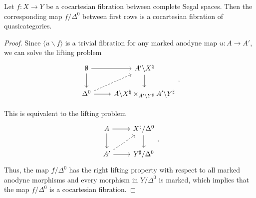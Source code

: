 \documentclass[main.tex]{subfiles}
\begin{document}
\begin{corollary}
  Let $f\colon X \to Y$ be a cocartesian fibration between complete Segal spaces. Then the corresponding map $f / \Delta^{0}$ between first rows is a cocartesian fibration of quasicategories.
\end{corollary}
\begin{proof}
  Since $\langle u \backslash f \rangle$ is a trivial fibration for any marked anodyne map $u\colon A \to A'$, we can solve the lifting problem
  \begin{equation*}
    \begin{tikzcd}
      \emptyset
      \arrow[r]
      \arrow[d]
      & A' \backslash X^{\natural}
      \arrow[d]
      \\
      \Delta^{0}
      \arrow[r]
      \arrow[ur, dashed]
      & A \backslash X^{\natural} \times_{A' \backslash Y^{\sharp}} A' \backslash Y^{\sharp}
    \end{tikzcd}.
  \end{equation*}

  This is equivalent to the lifting problem
  \begin{equation*}
    \begin{tikzcd}
      A
      \arrow[r]
      \arrow[d]
      & X^{\natural} / \Delta^{0}
      \arrow[d]
      \\
      A'
      \arrow[r]
      \arrow[ur, dashed]
      & Y^{\sharp} / \Delta^{0}
    \end{tikzcd}.
  \end{equation*}
  Thus, the map $f / \Delta^{0}$ has the right lifting property with respect to all marked anodyne morphisms and every morphism in $Y / \Delta^{0}$ is marked, which implies that the map $f / \Delta^{0}$ is a cocartesian fibration.
\end{proof}
\end{document}
